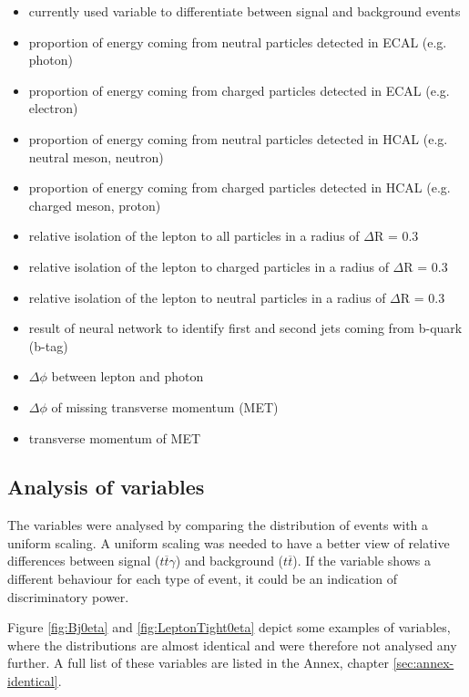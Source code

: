 \documentclass[11pt]{scrartcl}
\begin{document}
\begin{itemize}
  		\item currently used variable to differentiate between signal and background events
   		\item proportion of energy coming from neutral particles detected in ECAL (e.g. photon)
		\item proportion of energy coming from charged particles detected in ECAL (e.g. electron)
		\item proportion of energy coming from neutral particles detected in HCAL (e.g. neutral meson, neutron)
		\item proportion of energy coming from charged particles detected in HCAL (e.g. charged meson, proton)
  		\item relative isolation of the lepton to all particles in a radius of $\Delta$R = 0.3 %
		\item relative isolation of the lepton to charged particles in a radius of $\Delta$R = 0.3 %
		\item relative isolation of the lepton to neutral particles in a radius of $\Delta$R = 0.3 %
		\item result of neural network to identify first and second jets coming from b-quark (b-tag)
		\item $\Delta\phi$ between lepton and photon
		\item $\Delta\phi$ of missing transverse momentum (MET)
		\item transverse momentum of MET
\end{itemize}

	\subsection{Analysis of variables}
	
The variables were analysed by comparing the distribution of events with a uniform scaling. A uniform scaling was needed to have a better view of relative differences between signal ($t\overline{t}\gamma$) and background ($t\overline{t}$). If the variable shows a different behaviour for each type of event, it could be an indication of discriminatory power. 

Figure \ref{fig:Bj0eta} and \ref{fig:LeptonTight0eta} depict some examples of variables, where the distributions are almost identical and were therefore not analysed any further. A full list of these variables are listed in the Annex, chapter \ref{sec:annex-identical}. 
\end{document}
